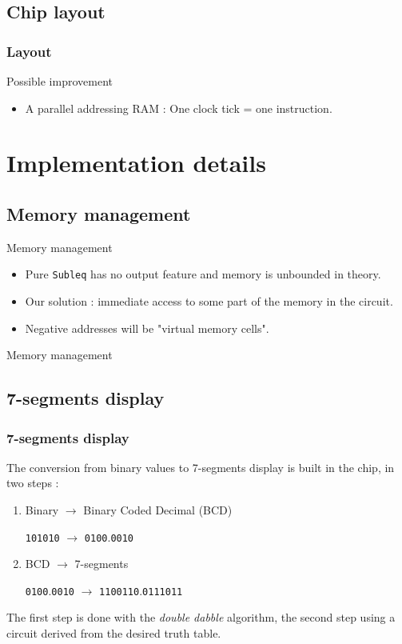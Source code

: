 \documentclass{beamer}
\begin{document}
\subsection{Chip layout}
\begin{frame}
    \frametitle{Layout}
    \centering
    
\end{frame}

\begin{frame}{Possible improvement}
  \begin{itemize}
    \item A parallel addressing RAM : One clock tick = one instruction.
  \end{itemize}
\end{frame}


\section{Implementation details}

\subsection{Memory management}

\begin{frame}{Memory management}
  \begin{itemize}
    \item Pure \texttt{Subleq} has no output feature and memory is
      unbounded in theory. %
    \item<2-> Our solution : immediate access to some part of the memory
      in the circuit.
    \item<3-> Negative addresses will be "virtual memory cells".
  \end{itemize}
\end{frame}

\begin{frame}{Memory management}
	\centering
	
\end{frame}

\subsection{7-segments display}

\begin{frame}
  \frametitle{7-segments display}
  The conversion from binary values to 7-segments display is built
  in the chip, in two steps :
  \begin{enumerate}
    \item<2-> Binary $\rightarrow$ Binary Coded Decimal (BCD)

          \texttt{101010} $\rightarrow$ \texttt{0100}.\texttt{0010}
    \item<3-> BCD $\rightarrow$ 7-segments

        \texttt{0100}.\texttt{0010} $\rightarrow$
        \texttt{1100110}.\texttt{0111011}
\end{enumerate}
The first step is done with the \emph{double dabble} algorithm,
the second step using a circuit derived from the desired truth table.

\end{frame}
\end{document}

